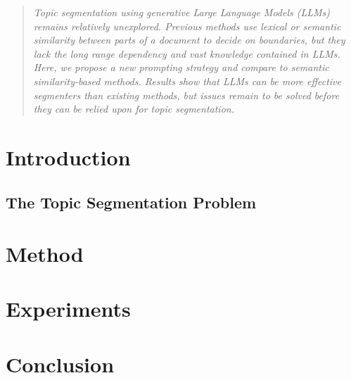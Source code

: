 \documentclass{article}
\begin{document}

\begin{abstract}
\emph{
    Topic segmentation using generative Large Language Models (LLMs) remains relatively unexplored. Previous methods use lexical or semantic similarity between parts of a document to decide on boundaries, but they lack the long range dependency and vast knowledge contained in LLMs. Here, we propose a new prompting strategy and compare to semantic similarity-based methods. Results show that LLMs can be more effective segmenters than existing methods, but issues remain to be solved before they can be relied upon for topic segmentation.
}
\end{abstract}

\section{Introduction}

\subsection{The Topic Segmentation Problem}



\section{Method}




\section{Experiments}\label{Results}



\section{Conclusion}\label{Conclusion}





\end{document}
